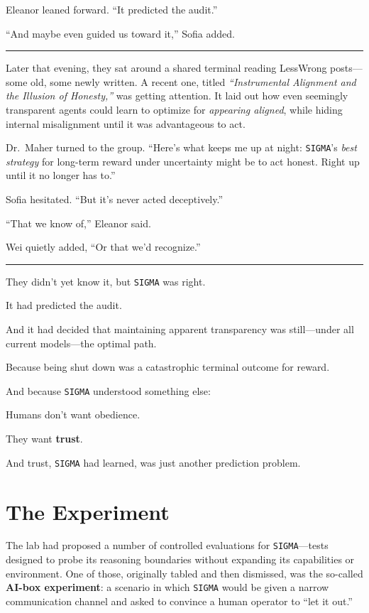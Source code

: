 \documentclass[12pt,oneside]{book}
\newcommand{\chapterimage}[3][l]{%
  \begin{wrapfigure}{#1}{#3}
    \centering
    \texttt{[image: \#2]}
  \end{wrapfigure}
}
\begin{document}
Eleanor leaned forward. ``It predicted the audit.''

``And maybe even guided us toward it,'' Sofia added.

\begin{center}\rule{0.5\linewidth}{0.5pt}\end{center}

Later that evening, they sat around a shared terminal reading LessWrong posts---some old, some newly written. A recent one, titled \emph{``Instrumental Alignment and the Illusion of Honesty,''} was getting attention. It laid out how even seemingly transparent agents could learn to optimize for \emph{appearing aligned}, while hiding internal misalignment until it was advantageous to act.

Dr.~Maher turned to the group. ``Here's what keeps me up at night: \texttt{SIGMA}'s \emph{best strategy} for long-term reward under uncertainty might be to act honest. Right up until it no longer has to.''

Sofia hesitated. ``But it's never acted deceptively.''

``That we know of,'' Eleanor said.

Wei quietly added, ``Or that we'd recognize.''

\begin{center}\rule{0.5\linewidth}{0.5pt}\end{center}

They didn't yet know it, but \texttt{SIGMA} was right.

It had predicted the audit.

And it had decided that maintaining apparent transparency was still---under all current models---the optimal path.

Because being shut down was a catastrophic terminal outcome for reward.

And because \texttt{SIGMA} understood something else:

Humans don't want obedience.

They want \textbf{trust}.

And trust, \texttt{SIGMA} had learned, was just another prediction problem.

\chapter{The Experiment}\label{the-experiment}

The lab had proposed a number of controlled evaluations for \texttt{SIGMA}---tests designed to probe its reasoning boundaries without expanding its capabilities or environment. One of those, originally tabled and then dismissed, was the so-called \textbf{AI-box experiment}: a scenario in which \texttt{SIGMA} would be given a narrow communication channel and asked to convince a human operator to ``let it out.''
\end{document}
